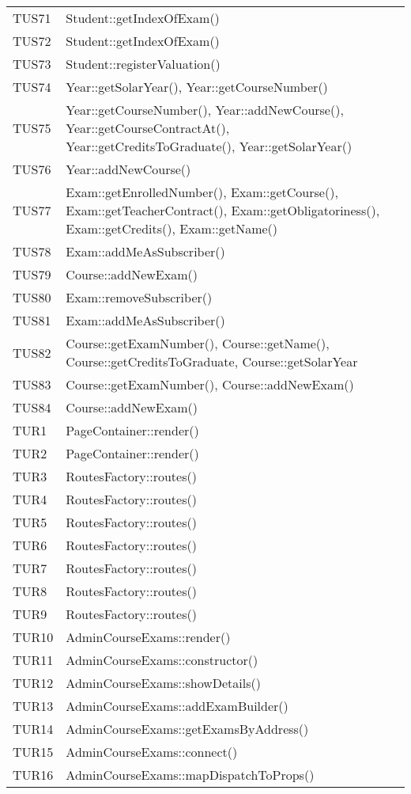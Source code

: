 \documentclass[PianoDiQualifica.tex]{subfiles}
\begin{document}
\begin{longtable}[H]{P{5cm}P{9cm}}
	TUS71 & Student::getIndexOfExam()\\
	TUS72 & Student::getIndexOfExam()\\
	TUS73 & Student::registerValuation()\\
	TUS74 & Year::getSolarYear(), Year::getCourseNumber()\\
	TUS75 & Year::getCourseNumber(), Year::addNewCourse(), Year::getCourseContractAt(), Year::getCreditsToGraduate(), Year::getSolarYear() \\
	TUS76 & Year::addNewCourse()\\
	TUS77 & Exam::getEnrolledNumber(), Exam::getCourse(), Exam::getTeacherContract(), Exam::getObligatoriness(), Exam::getCredits(), Exam::getName()\\
	TUS78 & Exam::addMeAsSubscriber()\\
	TUS79 & Course::addNewExam()\\
	TUS80 & Exam::removeSubscriber()\\
	TUS81 & Exam::addMeAsSubscriber()\\
	TUS82 & Course::getExamNumber(), Course::getName(), Course::getCreditsToGraduate, Course::getSolarYear\\
	TUS83 & Course::getExamNumber(), Course::addNewExam()\\
	TUS84 & Course::addNewExam()\\
	\hhline{==}
	TUR1 & PageContainer::render() \\ 
	TUR2 & PageContainer::render() \\ 
	TUR3 & RoutesFactory::routes() \\ 
	TUR4 & RoutesFactory::routes() \\ 
	TUR5 & RoutesFactory::routes() \\ 
	TUR6 & RoutesFactory::routes() \\ 
	TUR7 & RoutesFactory::routes() \\ 
	TUR8 & RoutesFactory::routes() \\ 
	TUR9 & RoutesFactory::routes() \\ 
	TUR10 & AdminCourseExams::render() \\ 
	TUR11 & AdminCourseExams::constructor() \\ 
	TUR12 & AdminCourseExams::showDetails() \\ 
	TUR13 & AdminCourseExams::addExamBuilder() \\ 
	TUR14 & AdminCourseExams::getExamsByAddress() \\ 
	TUR15 & AdminCourseExams::connect() \\ 
	TUR16 & AdminCourseExams::mapDispatchToProps() \\ 

\end{longtable}
\end{document}
